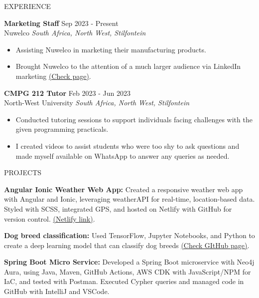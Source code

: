 \documentclass{resume} %
\begin{document}
\begin{rSection}{EXPERIENCE}

\textbf{Marketing Staff} \hfill Sep 2023 - Present\\
Nuwelco \hfill \textit{South Africa, North West, Stilfontein}
\begin{itemize}
    \itemsep -3pt {} 
    \item Assisting Nuwelco in marketing their manufacturing products.
    \item Brought Nuwelco to the attention of a much larger audience via LinkedIn marketing \href{https://www.linkedin.com/company/98936614/admin/feed/posts/}{(Check page)}.
\end{itemize}

\textbf{CMPG 212 Tutor} \hfill Feb 2023 - Jun 2023\\
North-West University \hfill \textit{South Africa, North West, Stilfontein}
\begin{itemize}
    \itemsep -3pt {} 
    \item Conducted tutoring sessions to support individuals facing challenges with the given programming practicals.
    \item I created videos to assist students who were too shy to ask questions and made myself available on WhatsApp to answer any queries as needed.
\end{itemize}

\end{rSection} 


\begin{rSection}{PROJECTS}
\vspace{-1.25em}
\item \textbf{Angular Ionic Weather Web App:} {Created a responsive weather web app with Angular and Ionic, leveraging weatherAPI for real-time, location-based data. Styled with SCSS, integrated GPS, and hosted on Netlify with GitHub for version control. \href{https://extraordinary-eclair-8e48b9.netlify.app/}{(Netlify link)}}.
\item \textbf{Dog breed classification:} {Used TensorFlow, Jupyter Notebooks, and Python to create a deep learning model that can classify dog breeds \href{https://github.com/XoXoTheFrozenFox/Dog_Breed_Classfication}{(Check GItHub page)}}.
\item \textbf{Spring Boot Micro Service:} {Developed a Spring Boot microservice with Neo4j Aura, using Java, Maven, GitHub Actions, AWS CDK with JavaScript/NPM for IaC, and tested with Postman. Executed Cypher queries and managed code in GitHub with IntelliJ and VSCode.
}
\end{rSection} 
\end{document}
